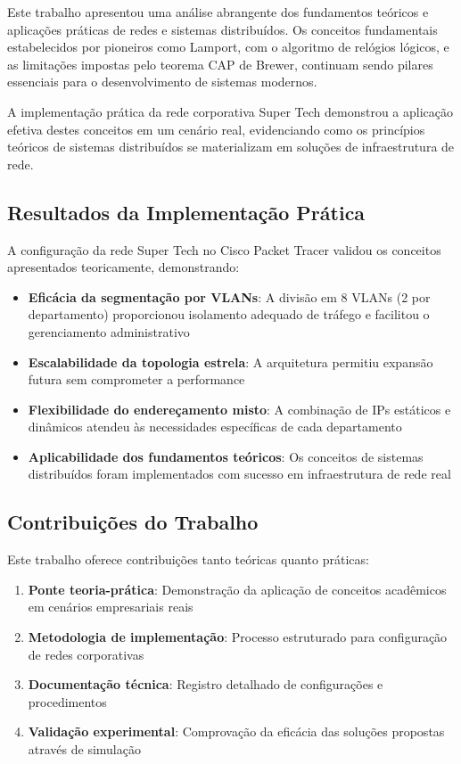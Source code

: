 Este trabalho apresentou uma análise abrangente dos fundamentos teóricos e aplicações práticas de redes e sistemas distribuídos. Os conceitos fundamentais estabelecidos por pioneiros como Lamport, com o algoritmo de relógios lógicos, e as limitações impostas pelo teorema CAP de Brewer, continuam sendo pilares essenciais para o desenvolvimento de sistemas modernos.

A implementação prática da rede corporativa Super Tech demonstrou a aplicação efetiva destes conceitos em um cenário real, evidenciando como os princípios teóricos de sistemas distribuídos se materializam em soluções de infraestrutura de rede.

\subsection{Resultados da Implementação Prática}

A configuração da rede Super Tech no Cisco Packet Tracer validou os conceitos apresentados teoricamente, demonstrando:

\begin{itemize}
    \item \textbf{Eficácia da segmentação por VLANs}: A divisão em 8 VLANs (2 por departamento) proporcionou isolamento adequado de tráfego e facilitou o gerenciamento administrativo
    \item \textbf{Escalabilidade da topologia estrela}: A arquitetura permitiu expansão futura sem comprometer a performance
    \item \textbf{Flexibilidade do endereçamento misto}: A combinação de IPs estáticos e dinâmicos atendeu às necessidades específicas de cada departamento
    \item \textbf{Aplicabilidade dos fundamentos teóricos}: Os conceitos de sistemas distribuídos foram implementados com sucesso em infraestrutura de rede real
\end{itemize}

\subsection{Contribuições do Trabalho}

Este trabalho oferece contribuições tanto teóricas quanto práticas:

\begin{enumerate}
    \item \textbf{Ponte teoria-prática}: Demonstração da aplicação de conceitos acadêmicos em cenários empresariais reais
    \item \textbf{Metodologia de implementação}: Processo estruturado para configuração de redes corporativas
    \item \textbf{Documentação técnica}: Registro detalhado de configurações e procedimentos
    \item \textbf{Validação experimental}: Comprovação da eficácia das soluções propostas através de simulação
\end{enumerate}

